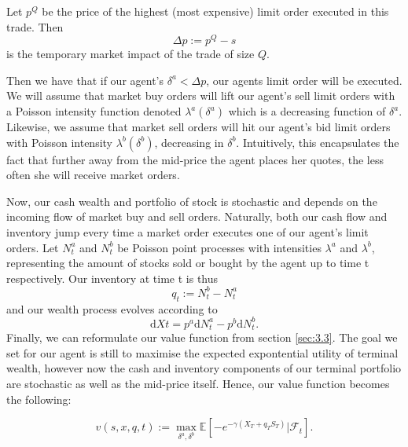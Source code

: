 \begin{definition}
    Let $p^Q$ be the price of the highest (most expensive) limit order 
    executed in this trade. Then 
    \begin{equation}
        \Delta p:=p^Q-s
    \end{equation}
    is the temporary market impact of the trade of size $Q.$ 
\end{definition}

Then we have that if our agent's $\delta^a < \Delta p$, our agents 
limit order will be executed. We will assume that market buy orders
will lift our agent's sell limit orders with a Poisson intensity function
denoted $\lambda^a(\delta^a)$ which is a decreasing function of $\delta^a$.
Likewise, we assume that market sell orders will hit our agent's bid 
limit orders with Poisson intensity $\lambda^b(\delta^b)$, decreasing
in $\delta^b$. Intuitively, this encapsulates the fact that further 
away from the mid-price the agent places her quotes, the less often she
will receive market orders.

Now, our cash wealth and portfolio of stock is stochastic and depends
on the incoming flow of market buy and sell orders. Naturally, both
our cash flow and inventory jump every time a market order executes 
one of our agent's limit orders. Let $N^a_t$ and $N^b_t$ be Poisson 
point processes with intensities $\lambda^a$ and $\lambda^b$, 
representing the amount of stocks sold or bought by the agent up to 
time t respectively. Our inventory at time t is thus 
\begin{equation}
    q_t:=N^b_t-N^a_t
\end{equation} 
and our wealth process evolves according to
\begin{equation}
    \mathrm dXt=p^a\mathrm dN^a_t-p^b\mathrm dN^b_t.
\end{equation}
Finally, we can reformulate our value function from section \ref{sec:3.3}.
The goal we set for our agent is still to maximise the expected 
expontential utility of terminal wealth, however now the cash and 
inventory components of our terminal portfolio are stochastic as 
well as the mid-price itself. Hence, our value function becomes 
the following:
\begin{definition}
    \begin{equation}\label{eq:3.12}
        v(s,x,q,t):=\max\limits_{\delta^a,\delta^b}\mathbb{E}\left[-e^{-\gamma(X_T+q_TS_T)}|\mathcal{F}_t\right].
    \end{equation}
\end{definition}

